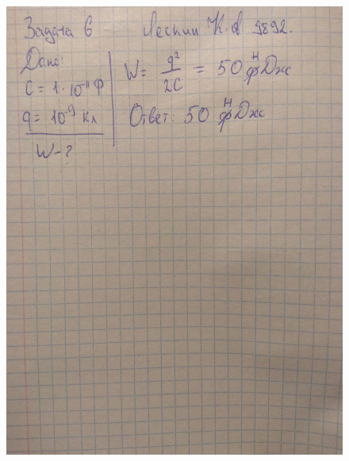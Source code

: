 \documentclass[12pt,a4paper]{article}  %
\begin{document}
	\begin{figure}[hpt!]
		\centering
		\includegraphics[width=1\linewidth]{photo/task6_solution_update_30_09}
	\end{figure}

	
\end{document}
